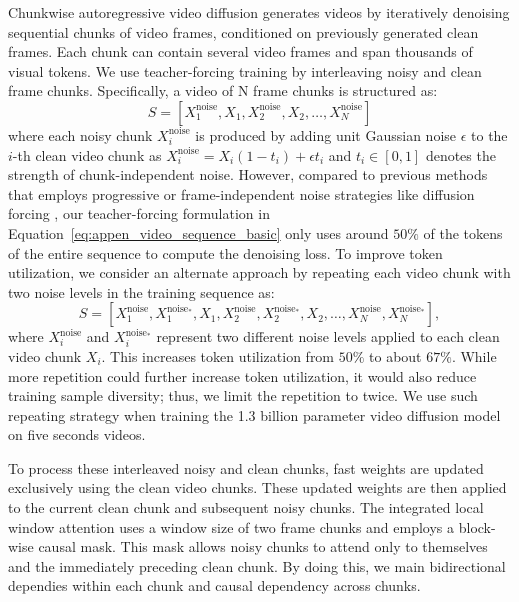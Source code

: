 Chunkwise autoregressive video diffusion generates videos by iteratively denoising sequential chunks of video frames, conditioned on previously generated clean frames. Each chunk can contain several video frames and span thousands of visual tokens.
We use teacher-forcing training by interleaving noisy and clean frame chunks. Specifically, a video of N frame chunks is structured as:
\begin{equation}
    S = [X_1^{\text{noise}}, X_1, X_2^{\text{noise}}, X_2, \ldots, X_N^{\text{noise}}]
    \label{eq:appen_video_sequence_basic}
\end{equation}
where each noisy chunk $X_i^{\text{noise}}$ is produced by adding unit Gaussian noise $\epsilon$ to the $i$-th clean video chunk as $X_i^{\text{noise}} = X_i (1 - t_i) + \epsilon t_i$ and $t_i \in [0, 1]$ denotes the strength of chunk-independent noise.  However, compared to previous methods that employs progressive \cite{ruhe2024rolling} or frame-independent noise strategies \cite{yin2024slow} like diffusion forcing \cite{chen2024diffusion},
our teacher-forcing formulation in Equation~\ref{eq:appen_video_sequence_basic} only uses around $50\%$ of the tokens of the entire sequence to compute the denoising loss. To improve token utilization, we consider an alternate approach by repeating each video chunk with two noise levels in the training sequence as:
\begin{equation}
    S = [X_1^{\text{noise}}, X_1^{\text{noise}_*},  X_1, X_2^{\text{noise}}, X_2^{\text{noise}_*},  X_2, \ldots, X_N^{\text{noise}}, X_N^{\text{noise}_*} ],
    \label{eq:video_sequence}
\end{equation}
where $X_i^{\text{noise}}$ and $X_i^{\text{noise}_*}$ represent two different noise levels applied to each clean video chunk $X_i$. This increases token utilization from $50\%$ to about $67\%$. While more repetition could further increase token utilization, it would also reduce training sample diversity; thus, we limit the repetition to twice. We use such repeating strategy when training the 1.3 billion parameter video diffusion model on five seconds videos. 

To process these interleaved noisy and clean chunks,  \methodname{} fast weights are updated exclusively using the clean video chunks. These updated weights are then applied to the current clean chunk and subsequent noisy chunks. The integrated local window attention uses a window size of two frame chunks and employs a block-wise causal mask. This mask allows noisy chunks to attend only to themselves and the immediately preceding clean chunk. By doing this, we main bidirectional dependies within each chunk and causal dependency across chunks. 

